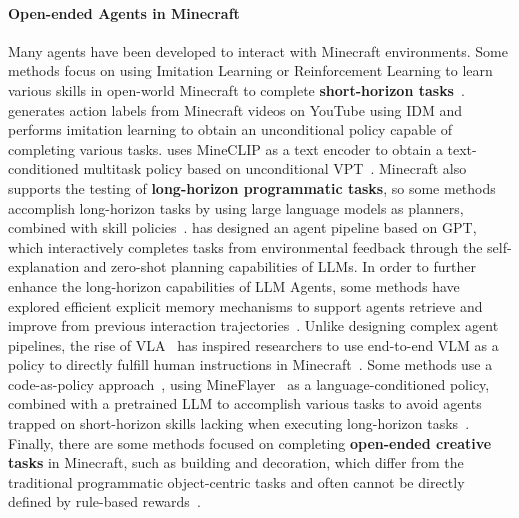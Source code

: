 \paragraph{Open-ended Agents in Minecraft} Many agents have been developed to interact with Minecraft environments.
Some methods focus on using Imitation Learning or Reinforcement Learning to learn various skills in open-world Minecraft to complete \textbf{short-horizon tasks}~\citep{vpt,groot,steve1,jiang2025reinforcement,zhao2024optimizing,groot15,yuan2024pre,cai2024groot,jiang2025visual}.
\citet{vpt} generates action labels from Minecraft videos on YouTube using IDM and performs imitation learning to obtain an unconditional policy capable of completing various tasks. \citet{steve1} uses MineCLIP as a text encoder to obtain a text-conditioned multitask policy based on unconditional VPT~\citep{vpt}.
Minecraft also supports the testing of \textbf{long-horizon programmatic tasks}, so some methods accomplish long-horizon tasks by using large language models as planners, combined with skill policies~\citep{deps,minedreamer,chen2024apt,plan4mc,mp5,zheng2023steve}.
\citet{deps} has designed an agent pipeline based on GPT, which interactively completes tasks from environmental feedback through the self-explanation and zero-shot planning capabilities of LLMs.
In order to further enhance the long-horizon capabilities of LLM Agents, some methods have explored efficient explicit memory mechanisms to support agents retrieve and improve from previous interaction trajectories~\citep{jarvis1,gitm,voyager,park2024mr,li2024optimus}.
Unlike designing complex agent pipelines, the rise of VLA~\citep{Brohan2023RT2VM,openvla} has inspired researchers to use end-to-end VLM as a policy to directly fulfill human instructions in Minecraft~\citep{omnijarvis,steve-2}.
Some methods use a code-as-policy approach~\citep{codeaspolicies}, using MineFlayer~\citep{mineflayer} as a language-conditioned policy, combined with a pretrained LLM to accomplish various tasks to avoid agents trapped on short-horizon skills lacking when executing long-horizon tasks~\citep{voyager,octupus,liu2024rl,liu2024odyssey}.
Finally, there are some methods focused on completing \textbf{open-ended creative tasks} in Minecraft, such as building and decoration, which differ from the traditional programmatic object-centric tasks and often cannot be directly defined by rule-based rewards~\citep{guo2024luban,zhang2023creative}.


